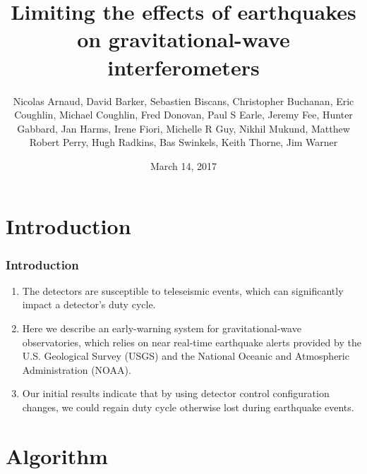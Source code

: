 \documentclass[ignorenonframetext,t,10pt]{beamer}
\title[Limiting the effects of earthquakes on gravitational-wave interferometers]{Limiting the effects of earthquakes on gravitational-wave interferometers}
\author[M.~Coughlin]{Nicolas Arnaud, David Barker, Sebastien Biscans, Christopher Buchanan, Eric Coughlin, Michael Coughlin, Fred Donovan, Paul S Earle, Jeremy Fee, Hunter Gabbard, Jan Harms, Irene Fiori, Michelle R Guy, Nikhil Mukund, Matthew Robert Perry, Hugh Radkins, Bas Swinkels, Keith Thorne, Jim Warner}
\date[]{March 14, 2017}
\begin{document}
\maketitle

\begin{frame}
\titlepage
\end{frame}

\section{Introduction}

\begin{frame}
\frametitle{Introduction}

  \begin{enumerate}
  \item The detectors are susceptible to teleseismic events, which can significantly impact a detector's duty cycle. 
  \item Here we describe an early-warning system for gravitational-wave observatories, which relies on near real-time earthquake alerts provided by the U.S. Geological Survey (USGS) and the National Oceanic and Atmospheric Administration (NOAA).
  \item Our initial results indicate that by using detector control configuration changes, we could regain duty cycle otherwise lost during earthquake events.
  \end{enumerate}
\end{frame}

\section{Algorithm}
\end{document}
